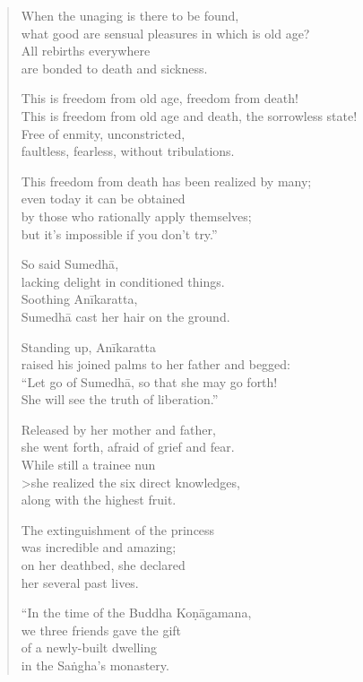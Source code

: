 \documentclass[12pt,openany]{book}%
\begin{document}
\begin{verse}
When the unaging is there to be found, \\
what good are sensual pleasures in which is old age? \\
All rebirths everywhere \\
are bonded to death and sickness. 

This is freedom from old age, freedom from death! \\
This is freedom from old age and death, the sorrowless state! \\
Free of enmity, unconstricted, \\
faultless, fearless, without tribulations. 

This freedom from death has been realized by many; \\
even today it can be obtained \\
by those who rationally apply themselves; \\
but it’s impossible if you don’t try.” 

So said \textsanskrit{Sumedhā}, \\
lacking delight in conditioned things. \\
Soothing \textsanskrit{Anīkaratta}, \\
\textsanskrit{Sumedhā} cast her hair on the ground. 

Standing up, \textsanskrit{Anīkaratta} \\
raised his joined palms to her father and begged: \\
“Let go of \textsanskrit{Sumedhā}, so that she may go forth! \\
She will see the truth of liberation.” 

Released by her mother and father, \\
she went forth, afraid of grief and fear. \\
While still a trainee nun \\>she realized the six direct knowledges, \\
along with the highest fruit. 

The extinguishment of the princess \\
was incredible and amazing; \\
on her deathbed, she declared \\
her several past lives. 

“In the time of the Buddha \textsanskrit{Koṇāgamana}, \\
we three friends gave the gift \\
of a newly-built dwelling \\
in the \textsanskrit{Saṅgha}’s monastery. 


\end{verse}
\end{document}
